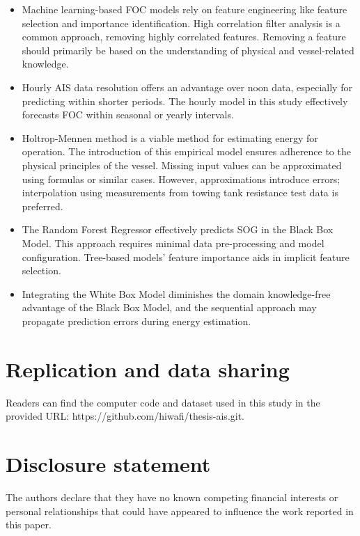 \documentclass[]{interact}
\theoremstyle{plain}%
\theoremstyle{definition}
\theoremstyle{remark}
\begin{document}
\begin{itemize}
  \item Machine learning-based FOC models rely on feature engineering like feature selection and importance identification. High correlation filter analysis is a common approach, removing highly correlated features. Removing a feature should primarily be based on the understanding of physical and vessel-related knowledge.
  \item Hourly AIS data resolution offers an advantage over noon data, especially for predicting within shorter periods. The hourly model in this study effectively forecasts FOC within seasonal or yearly intervals.
  \item Holtrop-Mennen method is a viable method for estimating energy for operation. The introduction of this empirical model ensures adherence to the physical principles of the vessel. Missing input values can be approximated using formulas or similar cases. However, approximations introduce errors; interpolation using measurements from towing tank resistance test data is preferred.
  \item The Random Forest Regressor effectively predicts SOG in the Black Box Model. This approach requires minimal data pre-processing and model configuration. Tree-based models' feature importance aids in implicit feature selection. 
  \item Integrating the White Box Model diminishes the domain knowledge-free advantage of the Black Box Model, and the sequential approach may propagate prediction errors during energy estimation.
\end{itemize}

\section*{Replication and data sharing}

Readers can find the computer code and dataset used in this study in the provided URL: https://github.com/hiwafi/thesis-ais.git. 

\section*{Disclosure statement}

The authors declare that they have no known competing financial interests or personal relationships that could have appeared to influence the work reported in this paper.




\end{document}

